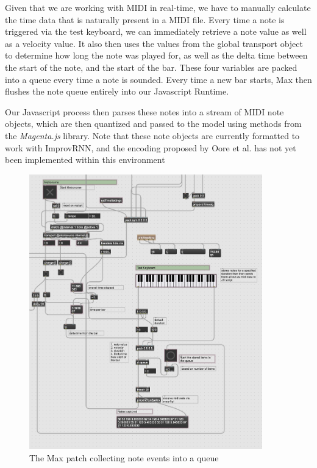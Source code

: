 \documentclass[../main.tex]{subfiles}
\begin{document}
Given that we are working with MIDI in real-time, we have to manually calculate the time data that is naturally present in a MIDI file. Every time a note is triggered via the test keyboard, we can immediately retrieve a note value as well as a velocity value. It also then uses the values from the global transport object to determine how long the note was played for, as well as the delta time between the start of the note, and the start of the bar. These four variables are packed into a queue every time a note is sounded. Every time a new bar starts, Max then flushes the note queue entirely into our Javascript Runtime. 

Our Javascript process then parses these notes into a stream of MIDI note objects, which are then quantized and passed to the model using methods from the \textit{Magenta.js} library. Note that these note objects are currently formatted to work with ImprovRNN, and the encoding proposed by Oore et al. has not yet been implemented within this environment

\begin{figure}[htpb]
    \centering
    \includegraphics[width=0.9\textwidth]{imgs/note_queuing_mechanism.png}
    \caption{The Max patch collecting note events into a queue}
    \label{fig:note_queuing_mechanism}
\end{figure}
\end{document}
